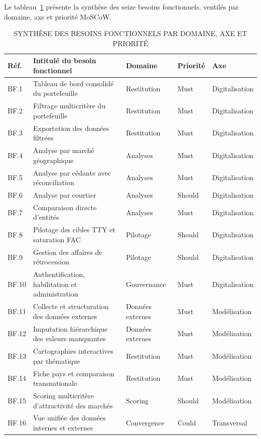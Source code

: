\documentclass[../main.tex]{subfiles}
\begin{document}
Le tableau~\ref{tab:bf_synthese} présente la synthèse des seize besoins fonctionnels, ventilés par domaine, axe et priorité MoSCoW.

\begin{table}[H]
\centering
\caption{SYNTHÈSE DES BESOINS FONCTIONNELS PAR DOMAINE, AXE ET PRIORITÉ}
\label{tab:bf_synthese}
\small
\begin{tabularx}{\textwidth}{@{}p{1.1cm}Xp{2.6cm}p{1.3cm}p{2cm}@{}}
\toprule
\textbf{Réf.} & \textbf{Intitulé du besoin fonctionnel} & \textbf{Domaine} & \textbf{Priorité} & \textbf{Axe} \\
\midrule
BF.1  & Tableau de bord consolidé du portefeuille         & Restitution      & Must   & Digitalisation \\
BF.2  & Filtrage multicritère du portefeuille             & Restitution      & Must   & Digitalisation \\
BF.3  & Exportation des données filtrées                  & Restitution      & Must   & Digitalisation \\
\midrule
BF.4  & Analyse par marché géographique                   & Analyses         & Must   & Digitalisation \\
BF.5  & Analyse par cédante avec réconciliation           & Analyses         & Must   & Digitalisation \\
BF.6  & Analyse par courtier                              & Analyses         & Should & Digitalisation \\
BF.7  & Comparaison directe d'entités                     & Analyses         & Must   & Digitalisation \\
\midrule
BF.8  & Pilotage des cibles TTY et saturation FAC         & Pilotage         & Should & Digitalisation \\
BF.9  & Gestion des affaires de rétrocession              & Pilotage         & Should & Digitalisation \\
\midrule
BF.10 & Authentification, habilitation et administration  & Gouvernance      & Must   & Digitalisation \\
\midrule
BF.11 & Collecte et structuration des données externes    & Données externes & Must   & Modélisation   \\
BF.12 & Imputation hiérarchique des valeurs manquantes    & Données externes & Must   & Modélisation   \\
\midrule
BF.13 & Cartographies interactives par thématique         & Restitution      & Must   & Modélisation   \\
BF.14 & Fiche pays et comparaison transnationale          & Restitution      & Must   & Modélisation   \\
\midrule
BF.15 & Scoring multicritère d'attractivité des marchés   & Scoring          & Should & Modélisation   \\
\midrule
BF.16 & Vue unifiée des données internes et externes      & Convergence      & Could  & Transversal    \\
\bottomrule
\end{tabularx}
\end{table}
\end{document}
